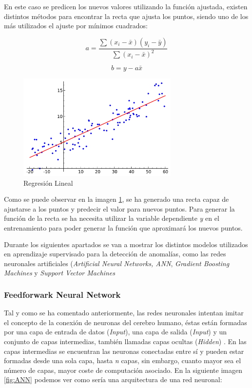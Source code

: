 En este caso se predicen los nuevos valores utilizando la función ajustada, existen distintos métodos para encontrar la recta que ajusta los puntos, siendo uno de los más utilizados el ajuste por mínimos cuadrados:

\begin{equation}
    a = \frac{\sum(x_i - \bar{x}) (y_i - \bar{y})} {\sum(x_i - \bar{x})^2}
\end{equation}

\begin{equation}
    b = y - a \bar{x}
\end{equation}

\begin{figure}[H]
	\centering
	\includegraphics[width=8cm]{figs/Linear_regression.png}
	\caption{Regresión Lineal}
	\label{fig:reglin}
\end{figure}

Como se puede observar en la imagen \ref{fig:reglin}, se ha generado una recta capaz de ajustarse a los puntos y predecir el valor para nuevos puntos. Para generar la función de la recta se ha necesita utilizar la variable dependiente \textit{y} en el entrenamiento para poder generar la función que aproximará los nuevos puntos. 

Durante los siguientes apartados se van a mostrar los distintos modelos utilizados en aprendizaje supervisado para la detección de anomalías, como las redes neuronales artificiales (\textit{Artificial Neural Networks, ANN}, \textit{Gradient Boosting Machines} y \textit{Support Vector Machines}

\subsubsection{Feedforwark Neural Network}

Tal y como se ha comentado anteriormente, las redes neuronales intentan imitar el concepto de la conexión de neuronas del cerebro humano, éstas están formadas por una capa de entrada de datos (\textit{Input}), una capa de salida (\textit{Input}) y un conjunto de capas intermedias, también llamadas capas ocultas (\textit{Hidden}) \cite{haykin1994neural}. En las capas intermedias se encuentran las neuronas conectadas entre sí y pueden estar formadas desde una sola capa, hasta \textit{n} capas, sin embargo, cuanto mayor sea el número de capas, mayor coste de computación asociado. En la siguiente imagen \ref{fig:ANN} podemos ver como sería una arquitectura de una red neuronal:

